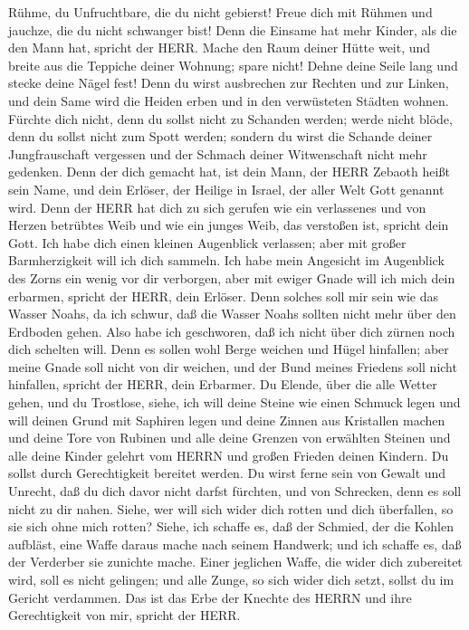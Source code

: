  Rühme, du Unfruchtbare, die du nicht gebierst! Freue dich
mit Rühmen und jauchze, die du nicht schwanger bist! Denn die Einsame
hat mehr Kinder, als die den Mann hat, spricht der HERR. 
Mache den Raum deiner Hütte weit, und breite aus die Teppiche deiner
Wohnung; spare nicht! Dehne deine Seile lang und stecke deine Nägel
fest!  Denn du wirst ausbrechen zur Rechten und zur Linken,
und dein Same wird die Heiden erben und in den verwüsteten Städten
wohnen.  Fürchte dich nicht, denn du sollst nicht zu
Schanden werden; werde nicht blöde, denn du sollst nicht zum Spott
werden; sondern du wirst die Schande deiner Jungfrauschaft vergessen und
der Schmach deiner Witwenschaft nicht mehr gedenken.  Denn
der dich gemacht hat, ist dein Mann, der HERR Zebaoth heißt sein Name,
und dein Erlöser, der Heilige in Israel, der aller Welt Gott genannt
wird.  Denn der HERR hat dich zu sich gerufen wie ein
verlassenes und von Herzen betrübtes Weib und wie ein junges Weib, das
verstoßen ist, spricht dein Gott.  Ich habe dich einen
kleinen Augenblick verlassen; aber mit großer Barmherzigkeit will ich
dich sammeln.  Ich habe mein Angesicht im Augenblick des
Zorns ein wenig vor dir verborgen, aber mit ewiger Gnade will ich mich
dein erbarmen, spricht der HERR, dein Erlöser.  Denn solches
soll mir sein wie das Wasser Noahs, da ich schwur, daß die Wasser Noahs
sollten nicht mehr über den Erdboden gehen. Also habe ich geschworen,
daß ich nicht über dich zürnen noch dich schelten will. 
Denn es sollen wohl Berge weichen und Hügel hinfallen; aber meine Gnade
soll nicht von dir weichen, und der Bund meines Friedens soll nicht
hinfallen, spricht der HERR, dein Erbarmer.  Du Elende,
über die alle Wetter gehen, und du Trostlose, siehe, ich will deine
Steine wie einen Schmuck legen und will deinen Grund mit Saphiren legen
 und deine Zinnen aus Kristallen machen und deine Tore von
Rubinen und alle deine Grenzen von erwählten Steinen  und
alle deine Kinder gelehrt vom HERRN und großen Frieden deinen Kindern.
 Du sollst durch Gerechtigkeit bereitet werden. Du wirst
ferne sein von Gewalt und Unrecht, daß du dich davor nicht darfst
fürchten, und von Schrecken, denn es soll nicht zu dir nahen.
 Siehe, wer will sich wider dich rotten und dich
überfallen, so sie sich ohne mich rotten?  Siehe, ich
schaffe es, daß der Schmied, der die Kohlen aufbläst, eine Waffe daraus
mache nach seinem Handwerk; und ich schaffe es, daß der Verderber sie
zunichte mache.  Einer jeglichen Waffe, die wider dich
zubereitet wird, soll es nicht gelingen; und alle Zunge, so sich wider
dich setzt, sollst du im Gericht verdammen. Das ist das Erbe der Knechte
des HERRN und ihre Gerechtigkeit von mir, spricht der HERR.

